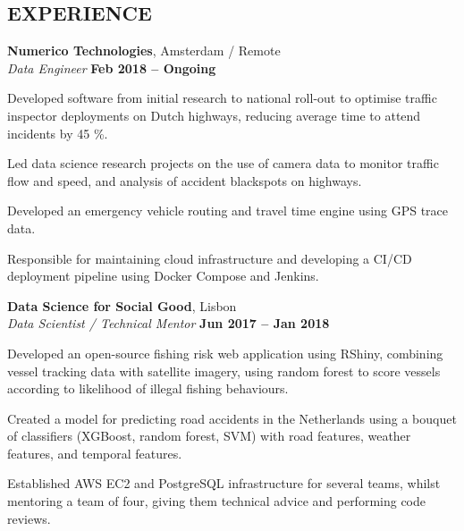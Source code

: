 \documentclass[margin,line]{resume}
\begin{document}
\begin{resume}
\sectionline
    \section{\mysidestyle \textbf{\large{E}\small{XPERIENCE}}}

    \textbf{\listing Numerico Technologies}, Amsterdam / Remote \vspace{2mm}\\\vspace{1mm}%
    \textsl{Data Engineer} \hfill \textbf{Feb 2018 -- Ongoing}
    \begin{list2}
        \item Developed software from initial research to national roll-out to optimise traffic inspector deployments on Dutch highways, reducing average time to attend incidents by 45 \%.
        \item Led data science research projects on the use of camera data to monitor traffic flow and speed, and analysis of accident blackspots on highways.
        \item Developed an emergency vehicle routing and travel time engine using GPS trace data.
        \item Responsible for maintaining cloud infrastructure and developing a CI/CD deployment pipeline using Docker Compose and Jenkins.
    \end{list2}

    \textbf{\listing Data Science for Social Good}, Lisbon \vspace{2mm}\\\vspace{1mm}%
    \textsl{Data Scientist / Technical Mentor} \hfill \textbf{Jun 2017 -- Jan 2018}
    \begin{list2}
        \item Developed an open-source fishing risk web application using RShiny, combining vessel tracking data with satellite imagery, using random forest to score vessels according to likelihood of illegal fishing behaviours.
        \item Created a model for predicting road accidents in the Netherlands using a bouquet of classifiers (XGBoost, random forest, SVM) with road features, weather features, and temporal features.
        \item Established AWS EC2 and PostgreSQL infrastructure for several teams, whilst mentoring a team of four, giving them technical advice and performing code reviews.
    \end{list2}


\end{resume}
\end{document}
